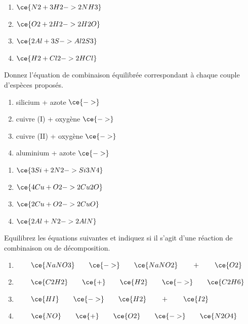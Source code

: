 \documentclass[
  11pt,
  a4paper,
  openany]{book}
\begin{document}
\begin{Answer}

\begin{enumerate}
\def\labelenumi{\arabic{enumi}.}
\item
  \(\ce{N2 + 3 H2 -> 2 NH3}\)
\item
  \(\ce{O2 + 2 H2 -> 2 H2O}\)
\item
  \(\ce{2Al + 3S -> Al2S3}\)
\item
  \(\ce{H2 + Cl2 -> 2 HCl}\)
\end{enumerate}

\end{Answer}

\begin{Exercise}

Donnez l'équation de combinaison équilibrée correspondant à chaque couple d'espèces proposés.

\begin{enumerate}
\def\labelenumi{\arabic{enumi}.}
\item
  silicium + azote \(\ce{->}\)
\item
  cuivre (I) + oxygène \(\ce{->}\)
\item
  cuivre (II) + oxygène \(\ce{->}\)
\item
  aluminium + azote \(\ce{->}\)
\end{enumerate}

\end{Exercise}

\begin{Answer}

\begin{enumerate}
\def\labelenumi{\arabic{enumi}.}
\item
  \(\ce{ 3Si + 2N2 -> Si3N4}\)
\item
  \(\ce{ 4Cu + O2 -> 2Cu2O}\)
\item
  \(\ce{ 2Cu + O2 -> 2CuO}\)
\item
  \(\ce{ 2Al + N2 -> 2AlN}\)
\end{enumerate}

\end{Answer}

\begin{Exercise}

Equilibrez les équations suivantes et indiquez si il s'agit d'une réaction de combinaison ou de décomposition.

\begin{enumerate}
\def\labelenumi{\arabic{enumi}.}
\item
  \(\qquad \ce{NaNO3} \qquad \ce{->} \qquad \ce{NaNO2} \qquad + \qquad \ce{O2}\)
\item
  \(\qquad \ce{C2H2} \qquad \ce{+} \qquad \ce{H2} \qquad \ce{->} \qquad \ce{C2H6}\)
\item
  \(\qquad \ce{HI} \qquad \ce{->} \qquad \ce{H2} \qquad + \qquad \ce{I2}\)
\item
  \(\qquad \ce{NO} \qquad \ce{+} \qquad \ce{O2} \qquad \ce{->} \qquad \ce{N2O4}\)
\end{enumerate}

\end{Exercise}
\end{document}
